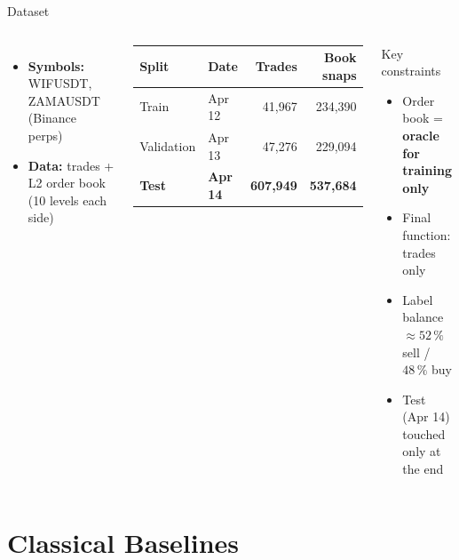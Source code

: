 \documentclass[aspectratio=169,10pt]{beamer}
\begin{document}
\begin{frame}{Dataset}
  \begin{columns}[T]
    \begin{itemize}
      \item \textbf{Symbols:} WIFUSDT, ZAMAUSDT \;(Binance perps)
      \item \textbf{Data:} trades + L2 order book (10 levels each side)
    \end{itemize}

    \medskip
    \begin{center}
    \begin{tabular}{llrr}
      \toprule
      Split & Date & Trades & Book snaps \\
      \midrule
      Train      & Apr 12 &   41{,}967 &  234{,}390 \\
      Validation & Apr 13 &   47{,}276 &  229{,}094 \\
      \textbf{Test} & \textbf{Apr 14} & \textbf{607{,}949} & \textbf{537{,}684} \\
      \bottomrule
    \end{tabular}
    \end{center}

    \begin{block}{Key constraints}
      \begin{itemize}
        \item Order book = \textbf{oracle for training only}
        \item Final function: trades only
        \item Label balance $\approx 52\,\%$ sell / $48\,\%$ buy
        \item Test (Apr 14) touched only at the end
      \end{itemize}
    \end{block}
  \end{columns}
\end{frame}

\section{Classical Baselines}
\end{document}

